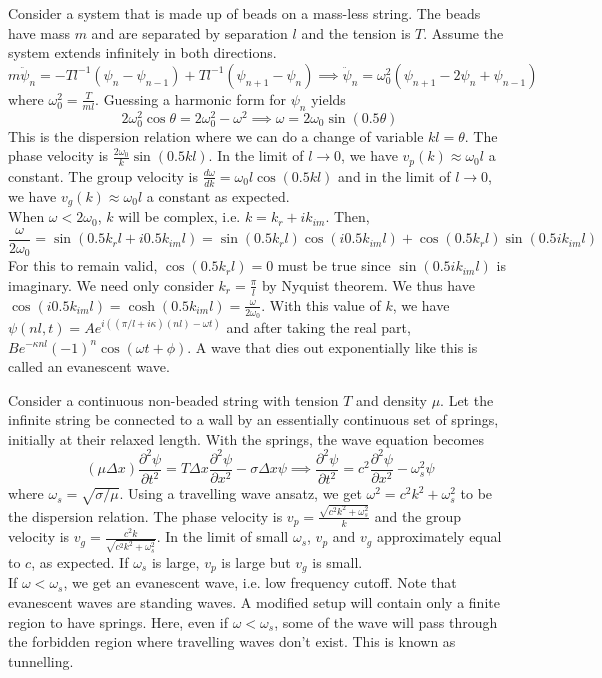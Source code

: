 \documentclass[a4paper]{article}
\begin{document}
\begin{eg}
Consider a system that is made up of beads on a mass-less string. The beads have mass $m$ and are separated by separation $l$ and the tension is $T$. Assume the system extends infinitely in both directions.
$$m\ddot{\psi}_n=-Tl^{-1}(\psi_n-\psi_{n-1})+Tl^{-1}(\psi_{n+1}-\psi_n)\implies\ddot{\psi}_n=\omega_0^2(\psi_{n+1}-2\psi_n+\psi_{n-1})$$
where $\omega_0^2=\frac{T}{ml}$. Guessing a harmonic form for $\psi_n$ yields $$2\omega_0^2\cos\theta=2\omega_0^2-\omega^2\implies\omega=2\omega_0\sin(0.5\theta)$$
This is the dispersion relation where we can do a change of variable $kl=\theta$. The phase velocity is $\frac{2\omega_0}{k}\sin(0.5kl)$. In the limit of $l\rightarrow0$, we have $v_p(k)\approx\omega_0l$ a constant. The group velocity is $\frac{d\omega}{dk}=\omega_0l\cos(0.5kl)$ and in the limit of $l\rightarrow0$, we have $v_g(k)\approx\omega_0l$ a constant as expected.\\[5pt]
When $\omega<2\omega_0$, $k$ will be complex, i.e. $k=k_r+ik_{im}$. Then,
$$\frac{\omega}{2\omega_0}=\sin(0.5k_rl+i0.5k_{im}l)=\sin(0.5k_rl)\cos(i0.5k_{im}l)+\cos(0.5k_rl)\sin(0.5ik_{im}l)$$
For this to remain valid, $\cos(0.5k_rl)=0$ must be true since $\sin(0.5ik_{im}l)$ is imaginary. We need only consider $k_r=\frac{\pi}{l}$ by Nyquist theorem. We thus have $\cos(i0.5k_{im}l)=\cosh(0.5k_{im}l)=\frac{\omega}{2\omega_0}$. With this value of $k$, we have
$\psi(nl,t)=Ae^{i((\pi/l+i\kappa)(nl)-\omega t)}$ and after taking the real part, $Be^{-\kappa nl}(-1)^n\cos(\omega t+\phi)$. A wave
that dies out exponentially like this is called an evanescent wave.
\end{eg}
\begin{eg}
Consider a continuous non-beaded string with tension $T$ and density $\mu$. Let the infinite string be connected to a wall by an essentially continuous set of springs, initially at their relaxed length. With the springs, the wave equation becomes
$$(\mu\Delta x)\frac{\partial^2\psi}{\partial t^2}=T\Delta x\frac{\partial^2\psi}{\partial x^2}-\sigma\Delta x\psi\implies\frac{\partial^2\psi}{\partial t^2}=c^2\frac{\partial^2\psi}{\partial x^2}-\omega_s^2\psi$$
where $\omega_s=\sqrt{\sigma/\mu}$. Using a travelling wave ansatz, we get $\omega^2=c^2k^2+\omega_s^2$ to be the dispersion relation. The phase velocity is $v_p=\frac{\sqrt{c^2k^2+\omega_s^2}}{k}$ and the group velocity is $v_g=\frac{c^2k}{\sqrt{c^2k^2+\omega_s^2}}$. In the limit of small $\omega_s$, $v_p$ and $v_g$ approximately equal to $c$, as expected. If $\omega_s$ is large, $v_p$ is large but $v_g$ is small.\\[5pt]
If $\omega<\omega_s$, we get an evanescent wave, i.e. low frequency cutoff. Note that evanescent waves are standing waves. A modified setup will contain only a finite region to have springs. Here, even if $\omega<\omega_s$, some of the wave will pass through the forbidden region where travelling waves don't exist. This is known as tunnelling.
\end{eg}
\end{document}
